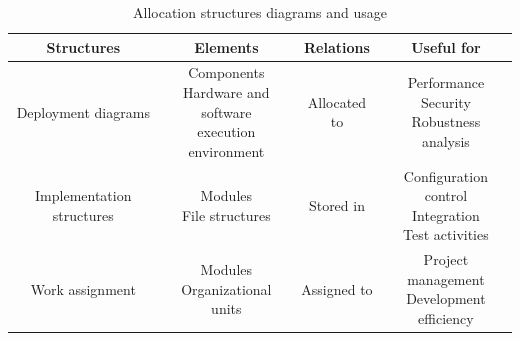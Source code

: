 \documentclass[12pt, a4paper]{report}
\begin{document}
            \begin{table}[H]
                \centering
                \begin{tabular}{c|ccc}
                \hline
                \textbf{Structures}         & \textbf{Elements}                                                         & \textbf{Relations}    & \textbf{Useful for}                                                   \\ \hline
                Deployment diagrams         & \makecell{Components\\Hardware and software\\execution environment}       & Allocated to          & \makecell{Performance\\Security\\Robustness analysis}                 \\ \hline
                Implementation structures   & \makecell{Modules\\File structures}                                       & Stored in             & \makecell{Configuration control\\Integration\\Test activities}        \\ \hline
                Work assignment             & \makecell{Modules\\Organizational units}                                  & Assigned to           & \makecell{Project management\\Development efficiency}                 \\ \hline
                \end{tabular}
                \caption{Allocation structures diagrams and usage}
                \label{tab:my-table2}
            \end{table}
\end{document}
